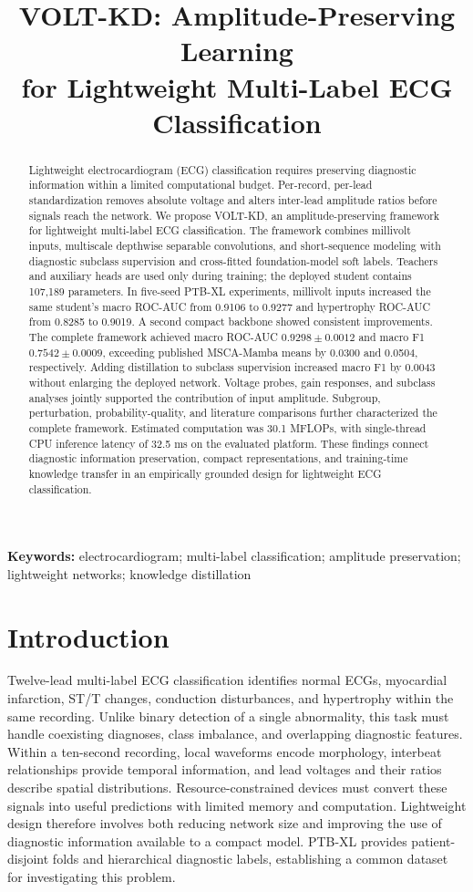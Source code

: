 \documentclass[11pt,a4paper]{article}
\title{\textbf{VOLT-KD: Amplitude-Preserving Learning\\for Lightweight Multi-Label ECG Classification}}
\author{}
\date{}
\begin{document}
\maketitle
\vspace{-2em}
\begin{abstract}
Lightweight electrocardiogram (ECG) classification requires preserving diagnostic information within a limited computational budget. Per-record, per-lead standardization removes absolute voltage and alters inter-lead amplitude ratios before signals reach the network. We propose VOLT-KD, an amplitude-preserving framework for lightweight multi-label ECG classification. The framework combines millivolt inputs, multiscale depthwise separable convolutions, and short-sequence modeling with diagnostic subclass supervision and cross-fitted foundation-model soft labels. Teachers and auxiliary heads are used only during training; the deployed student contains 107,189 parameters. In five-seed PTB-XL experiments, millivolt inputs increased the same student's macro ROC-AUC from 0.9106 to 0.9277 and hypertrophy ROC-AUC from 0.8285 to 0.9019. A second compact backbone showed consistent improvements. The complete framework achieved macro ROC-AUC $0.9298\pm0.0012$ and macro F1 $0.7542\pm0.0009$, exceeding published MSCA-Mamba means by 0.0300 and 0.0504, respectively. Adding distillation to subclass supervision increased macro F1 by 0.0043 without enlarging the deployed network. Voltage probes, gain responses, and subclass analyses jointly supported the contribution of input amplitude. Subgroup, perturbation, probability-quality, and literature comparisons further characterized the complete framework. Estimated computation was 30.1 MFLOPs, with single-thread CPU inference latency of 32.5 ms on the evaluated platform. These findings connect diagnostic information preservation, compact representations, and training-time knowledge transfer in an empirically grounded design for lightweight ECG classification.
\end{abstract}
\noindent\textbf{Keywords:} electrocardiogram; multi-label classification; amplitude preservation; lightweight networks; knowledge distillation

\section{Introduction}
Twelve-lead multi-label ECG classification identifies normal ECGs, myocardial infarction, ST/T changes, conduction disturbances, and hypertrophy within the same recording\cite{wagner2020}. Unlike binary detection of a single abnormality, this task must handle coexisting diagnoses, class imbalance, and overlapping diagnostic features. Within a ten-second recording, local waveforms encode morphology, interbeat relationships provide temporal information, and lead voltages and their ratios describe spatial distributions. Resource-constrained devices must convert these signals into useful predictions with limited memory and computation. Lightweight design therefore involves both reducing network size and improving the use of diagnostic information available to a compact model. PTB-XL provides patient-disjoint folds and hierarchical diagnostic labels, establishing a common dataset for investigating this problem\cite{wagner2020}.
\end{document}
